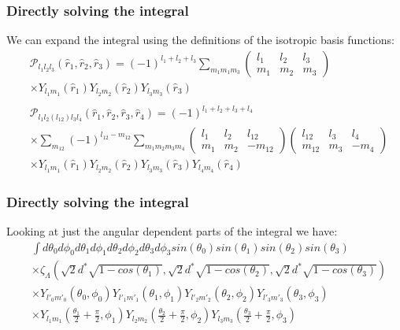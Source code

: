 \documentclass{beamer}
\begin{document}
    \begin{frame}
        \frametitle{Directly solving the integral}
        We can expand the integral using the definitions of the isotropic basis functions:
        \begin{align*}
            &\mathcal P_{l_1 l_2 l_3}(\hat r_1, \hat r_2, \hat r_3) = (-1)^{l_1+l_2+l_3} \sum_{m_1 m_1 m_3} 
            \begin{pmatrix}
            l_1 & l_2 & l_3\\
            m_1 & m_2 & m_3
            \end{pmatrix}\\
            &\times Y_{l_1 m_1}(\hat r_1)Y_{l_2 m_2}(\hat r_2)Y_{l_3 m_3}(\hat r_3)\\ 
            &\\
            &\mathcal P_{l_1 l_2 (l_{12}) l_3 l_4}(\hat r_1, \hat r_2, \hat r_3, \hat r_4) = (-1)^{l_1+l_2+l_3+l_4}\\
            &\times \sum_{m_{12}} (-1)^{l_{12}-m_{12}}
            \sum_{m_1 m_2 m_3 m_4}
            \begin{pmatrix}
                l_1 & l_2 & l_{12}\\
                m_1 & m_2 & -m_{12}
            \end{pmatrix}
            \begin{pmatrix}
                l_{12} & l_3 & l_4\\
                m_{12} & m_3 & -m_4
            \end{pmatrix}\\
            &\times Y_{l_1 m_1}(\hat r_1)Y_{l_2 m_2}(\hat r_2)Y_{l_3 m_3}(\hat r_3)Y_{l_4 m_4}(\hat r_4)
        \end{align*}
    \end{frame}

    \begin{frame}
        \frametitle{Directly solving the integral}
        Looking at just the angular dependent parts of the integral we have:
        \begin{align*}
            &\int d\theta_0 d\phi_0 d\theta_1 d\phi_1 d\theta_2 d\phi_2 d\theta_3 d\phi_3 sin(\theta_0) sin(\theta_1) sin(\theta_2) sin(\theta_3) \\
            &\times \zeta_{\Lambda}(\sqrt{2}d^*\sqrt{1-cos(\theta_1)}, \sqrt{2}d^*\sqrt{1-cos(\theta_2)}, \sqrt{2}d^*\sqrt{1-cos(\theta_3)})\\
            &\times Y_{l'_0 m'_0}(\theta_0, \phi_0) Y_{l'_1 m'_1}(\theta_1, \phi_1) Y_{l'_2 m'_2}(\theta_2, \phi_2) Y_{l'_3 m'_3}(\theta_3, \phi_3) \\
            &\times Y_{l_1 m_1}(\frac{\theta_1}{2} + \frac{\pi}{2}, \phi_1) Y_{l_2 m_2}(\frac{\theta_2}{2} + \frac{\pi}{2}, \phi_2) Y_{l_3 m_3}(\frac{\theta_3}{2} + \frac{\pi}{2}, \phi_3)
        \end{align*}
    \end{frame}
\end{document}
